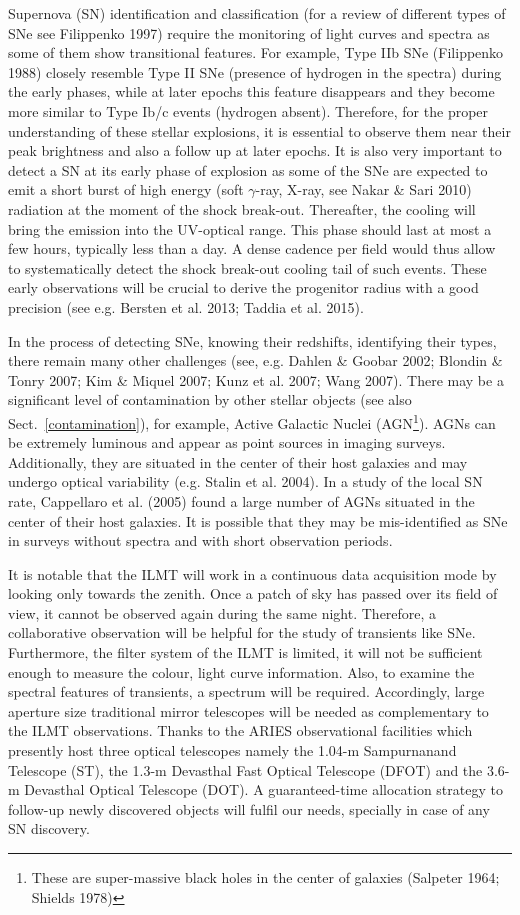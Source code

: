 \documentclass[12pt,a4paper]{article}
\begin{document}
Supernova (SN) identification and classification (for a review of different types of SNe see Filippenko 1997)
require the monitoring of light curves and spectra as some of them show transitional features. For example,
Type IIb SNe (Filippenko 1988) closely resemble Type II SNe (presence of hydrogen in the spectra)
during the early phases, while at later epochs this feature disappears and they become more similar to
Type Ib/c events (hydrogen absent).
Therefore, for the proper understanding of these stellar explosions, it is essential to observe them
near their peak brightness and also a follow up at later epochs. It is also very important to detect a SN
at its early phase of explosion as some of the SNe are expected to emit a short burst of high energy
(soft $\gamma$-ray, X-ray, see Nakar \& Sari 2010) radiation at the moment of the shock break-out. 
Thereafter, the cooling will bring the emission into the UV-optical range.
This phase should last at most a few hours, typically less than a day. A dense cadence 
per field would thus allow to systematically detect the shock break-out cooling tail of such events. 
These early observations will be crucial to derive the progenitor radius with a good precision 
(see e.g. Bersten et al. 2013; Taddia et al. 2015).


In the process of detecting SNe, knowing their redshifts, identifying their types, there remain many other 
challenges (see, e.g. Dahlen \& Goobar 2002; Blondin \& Tonry 2007; Kim \& Miquel 2007; Kunz et al. 2007; 
Wang 2007).
There may be a significant level of contamination by other stellar objects (see also
Sect.~\ref{contamination}), for example, Active Galactic Nuclei (AGN\footnote{These are super-massive
black holes in the center of galaxies (Salpeter 1964; Shields 1978)}).
AGNs can be extremely luminous and appear as point sources in imaging surveys. Additionally, they are
situated in the center of their host galaxies and may undergo optical variability (e.g. Stalin et al. 2004).
In a study of the local SN rate, Cappellaro et al. (2005) found a large number of AGNs situated in the
center of their host galaxies. It is possible that they may be mis-identified as SNe in surveys without
spectra and with short observation periods.


It is notable that the ILMT will work in a continuous data acquisition mode by looking only towards the zenith. 
Once a patch of sky has passed over its field of view, it cannot be observed again during the same night. 
Therefore, a collaborative observation will be helpful for the study of transients like SNe. 
Furthermore, the filter system of the ILMT is limited, it will not be sufficient
enough to measure the colour, light curve information. Also, to examine the
spectral features of transients, a spectrum  will be required. Accordingly, large
aperture size traditional mirror telescopes will be needed as complementary to the
ILMT observations.
Thanks to the ARIES observational facilities which presently host three optical telescopes namely the 
1.04-m Sampurnanand Telescope (ST), the 1.3-m Devasthal Fast Optical Telescope (DFOT) and the 
3.6-m Devasthal Optical Telescope (DOT). 
A guaranteed-time allocation strategy to follow-up newly discovered objects will fulfil our needs, 
specially in case of any SN discovery.
\end{document}
